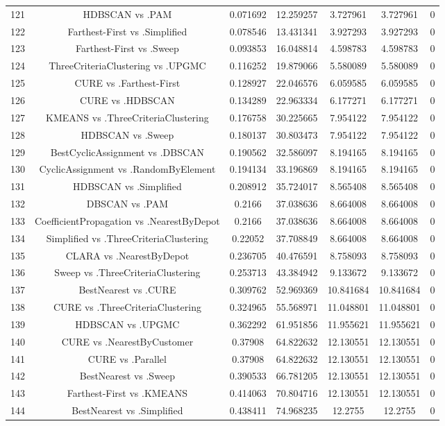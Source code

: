 \documentclass[a4paper,10pt]{article}
\begin{document}
\begin{landscape}
\begin{table}[!htp]
\begin{tabular}{ccccccc}
121&HDBSCAN vs .PAM&0.071692&12.259257&3.727961&3.727961&0\\
122&Farthest-First vs .Simplified&0.078546&13.431341&3.927293&3.927293&0\\
123&Farthest-First vs .Sweep&0.093853&16.048814&4.598783&4.598783&0\\
124&ThreeCriteriaClustering vs .UPGMC&0.116252&19.879066&5.580089&5.580089&0\\
125&CURE vs .Farthest-First&0.128927&22.046576&6.059585&6.059585&0\\
126&CURE vs .HDBSCAN&0.134289&22.963334&6.177271&6.177271&0\\
127&KMEANS vs .ThreeCriteriaClustering&0.176758&30.225665&7.954122&7.954122&0\\
128&HDBSCAN vs .Sweep&0.180137&30.803473&7.954122&7.954122&0\\
129&BestCyclicAssignment vs .DBSCAN&0.190562&32.586097&8.194165&8.194165&0\\
130&CyclicAssignment vs .RandomByElement&0.194134&33.196869&8.194165&8.194165&0\\
131&HDBSCAN vs .Simplified&0.208912&35.724017&8.565408&8.565408&0\\
132&DBSCAN vs .PAM&0.2166&37.038636&8.664008&8.664008&0\\
133&CoefficientPropagation vs .NearestByDepot&0.2166&37.038636&8.664008&8.664008&0\\
134&Simplified vs .ThreeCriteriaClustering&0.22052&37.708849&8.664008&8.664008&0\\
135&CLARA vs .NearestByDepot&0.236705&40.476591&8.758093&8.758093&0\\
136&Sweep vs .ThreeCriteriaClustering&0.253713&43.384942&9.133672&9.133672&0\\
137&BestNearest vs .CURE&0.309762&52.969369&10.841684&10.841684&0\\
138&CURE vs .ThreeCriteriaClustering&0.324965&55.568971&11.048801&11.048801&0\\
139&HDBSCAN vs .UPGMC&0.362292&61.951856&11.955621&11.955621&0\\
140&CURE vs .NearestByCustomer&0.37908&64.822632&12.130551&12.130551&0\\
141&CURE vs .Parallel&0.37908&64.822632&12.130551&12.130551&0\\
142&BestNearest vs .Sweep&0.390533&66.781205&12.130551&12.130551&0\\
143&Farthest-First vs .KMEANS&0.414063&70.804716&12.130551&12.130551&0\\
144&BestNearest vs .Simplified&0.438411&74.968235&12.2755&12.2755&0\\

\end{tabular}
\end{table}
\end{landscape}
\end{document}
